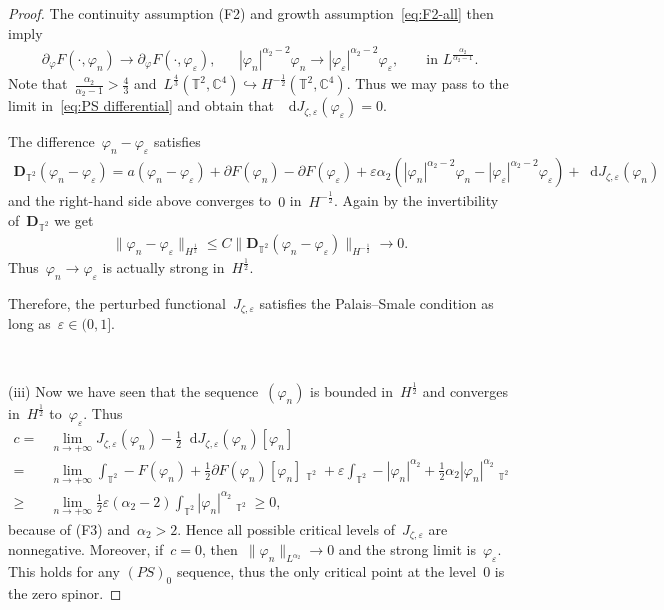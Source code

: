\documentclass[10pt,a4paper]{amsart}
\newcommand{\p}{\partial}
\newcommand{\C}{\mathbb{C}}
\newcommand{\T}{\mathbb{T}}
\newcommand{\dd}{\mathop{}\!\mathrm{d}}
\newcommand{\eps}{\varepsilon}
\newcommand{\pD}{\mathbf{D}}
\newcommand{\parenthesis}[1]{\left(#1\right)} %
\DeclareMathOperator{\dv}{\dd{vol}}
\begin{document}
\begin{proof}
    The continuity assumption (F2) and growth assumption~\eqref{eq:F2-all} then imply 
    \begin{align}
        \p_\varphi F(\cdot, \varphi_n) \to \p_\varphi F(\cdot,\varphi_\eps), & & 
        |\varphi_n|^{\alpha_2-2}\varphi_n \to |\varphi_\eps|^{\alpha_2-2} \varphi_\eps, & & 
        \mbox{ in  } L^{\frac{\alpha_2}{\alpha_2-1}}.
    \end{align}
    Note that~$\frac{\alpha_2}{\alpha_2-1}>\frac{4}{3}$ and~$L^{\frac{4}{3}}(\T^2,\C^4) \hookrightarrow H^{-\frac{1}{2}}(\T^2,\C^4)$.
    Thus we may pass to the limit in~\eqref{eq:PS differential} and obtain that~$\dd J_{\zeta,\eps}(\varphi_\eps)=0$. 
    
    

    The difference~$\varphi_n-\varphi_\eps$ satisfies
    \begin{align}
        \pD_{\T^2}(\varphi_n-\varphi_\eps)
        =a(\varphi_n-\varphi_\eps)+\partial F(\varphi_n)-\partial F(\varphi_\eps) + \eps \alpha_2 \parenthesis{|\varphi_n|^{\alpha_2-2} \varphi_n - |\varphi_\eps|^{\alpha_2-2}\varphi_\eps }  + \dd J_{\zeta,\eps}(\varphi_n)
    \end{align}
    and the right-hand side above converges to~$0$ in~$H^{-\frac{1}{2}}$. 
    Again by the invertibility of~$\pD_{\T^2}$ we get 
    \begin{align}
        \|\varphi_n-\varphi_\eps\|_{H^{\frac{1}{2}}} \leq C\|\pD_{\T^2}(\varphi_n-\varphi_\eps)\|_{H^{-\frac{1}{2}}} \to 0.
    \end{align}
    Thus~$\varphi_n \to \varphi_\eps$ is actually strong in~$H^{\frac{1}{2}}$. 

    Therefore, the perturbed functional~$J_{\zeta,\eps}$ satisfies the Palais--Smale condition as long as~$\eps\in (0,1]$.

    \

    (iii) Now we have seen that the sequence~$(\varphi_n)$ is bounded in~$H^{\frac{1}{2}}$ and converges in~$H^{\frac{1}{2}}$ to~$\varphi_\eps$. 
    Thus
    \begin{align}
        c=&\lim_{n\to+\infty} J_{\zeta,\eps}(\varphi_n) - \frac{1}{2}\dd J_{\zeta,\eps}(\varphi_n)[\varphi_n] \\
        =&\lim_{n\to+\infty} \int_{\T^2} -F(\varphi_n)+\frac{1}{2}\partial F(\varphi_n)[\varphi_n]\dv_{\T^2}
           +\eps\int_{\T^2} -|\varphi_n|^{\alpha_2} +\frac{1}{2}\alpha_2|\varphi_n|^{\alpha_2}\dv_{\T^2} \\
        \geq & \lim_{n\to+\infty}\frac{1}{2}\eps(\alpha_2-2)\int_{\T^2} |\varphi_n|^{\alpha_2}\dv_{\T^2} \geq 0,
    \end{align}
    because of (F3) and~$\alpha_2>2$.
    Hence all possible critical levels of~$J_{\zeta,\eps}$ are nonnegative.
    Moreover, if~$c=0$, then~$\|\varphi_n\|_{L^{\alpha_2}}\to 0$ and the strong limit is~$\varphi_\eps$. 
    This holds for any $(PS)_0$ sequence, thus the only critical point at the level~$0$ is the zero spinor. 
\end{proof}
\end{document}
